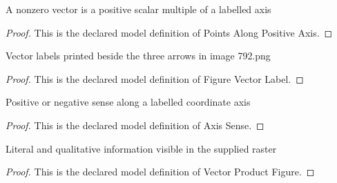 \begin{definition}
  \label{def:physics:phyx-mini-0792:phyxminiproblems-problemphyxmini0792-pointsalongpositiveaxis}
  A nonzero vector is a positive scalar multiple of a labelled axis
\end{definition}
\begin{proof}
  This is the declared model definition of Points Along Positive Axis.
\end{proof}
\begin{definition}
  \label{def:physics:phyx-mini-0792:phyxminiproblems-problemphyxmini0792-figurevectorlabel}
  Vector labels printed beside the three arrows in image 792.png
\end{definition}
\begin{proof}
  This is the declared model definition of Figure Vector Label.
\end{proof}
\begin{definition}
  \label{def:physics:phyx-mini-0792:phyxminiproblems-problemphyxmini0792-axissense}
  Positive or negative sense along a labelled coordinate axis
\end{definition}
\begin{proof}
  This is the declared model definition of Axis Sense.
\end{proof}
\begin{definition}
  \label{def:physics:phyx-mini-0792:phyxminiproblems-problemphyxmini0792-vectorproductfigure}
  Literal and qualitative information visible in the supplied raster
\end{definition}
\begin{proof}
  This is the declared model definition of Vector Product Figure.
\end{proof}
